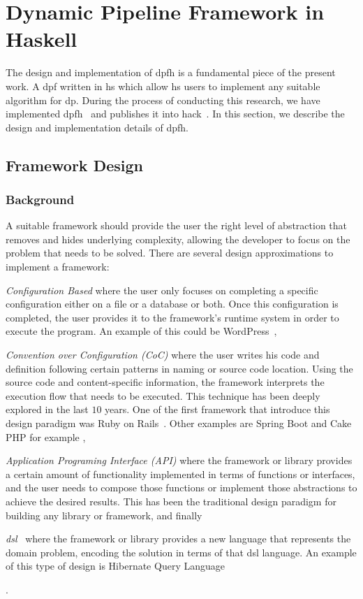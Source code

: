 \section{Dynamic Pipeline Framework in Haskell}\label{dp-hs}
The design and implementation of \acrfull{dpfh} is a fundamental piece of the present work. 
A \acrlong{dpf} written in \acrlong{hs} which allow \acrshort{hs} users to implement any suitable algorithm for \acrlong{dp}.
During the process of conducting this research, we have implemented \acrshort{dpfh}~\cite{dynamic-pipeline} and publishes it into \acrlong{hack}~\cite{hackage}.
In this section, we describe the design and implementation details of \acrshort{dpfh}.

\subsection{Framework Design}

\subsubsection{Background}
A suitable framework should provide the user the right level of abstraction that removes and hides underlying complexity, 
allowing the developer to focus on the problem that needs to be solved.
There are several design approximations to implement a framework: \begin{inparaenum}[i\upshape)]
  \item  \emph{Configuration Based} where the user only focuses on completing a specific configuration either on a file or a database or both. Once this configuration is completed, the user provides it to the framework's runtime system in order to execute the program. An example of this could be WordPress~\cite{wordpress},
  \item  \emph{Convention over Configuration (CoC)} where the user writes his code and definition following certain patterns in naming or source code location. Using the source code and content-specific information, the framework interprets the execution flow that needs to be executed. This technique has been deeply explored in the last $10$ years. One of the first framework that introduce this design paradigm was Ruby on Rails~\cite{rubyonrails}. Other examples are Spring Boot and Cake PHP for example \cite{springboot, cakephp},
  \item \emph{Application Programing Interface (API)} where the framework or library provides a certain amount of functionality implemented in terms of functions or interfaces, and the user needs to compose those functions or implement those abstractions to achieve the desired results. This has been the traditional design paradigm for building any library or framework, and finally
  \item \emph{\acrfull{dsl}}~\cite{Fowler10} where the framework or library provides a new language that represents the domain problem, encoding the solution in terms of that \acrshort{dsl} language. An example of this type of design is Hibernate Query Language~\cite{hql}
   \end{inparaenum}.

